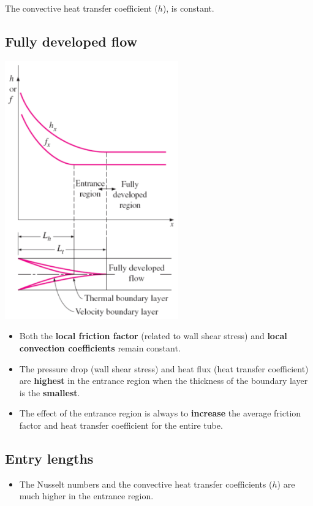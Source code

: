 \documentclass[11pt]{article}
\begin{document}
The convective heat transfer coefficient (\(h\)), is constant.

\subsection{Fully developed flow}
\label{sec:org5c82d1b}
\begin{center}
\includegraphics[height=30em]{./images/fully-developed-flow-diagram.png}
\end{center}
\begin{itemize}
\item Both the \textbf{local friction factor} (related to wall shear stress) and \textbf{local convection coefficients} remain constant.
\item The pressure drop (wall shear stress) and heat flux (heat transfer coefficient) are \textbf{highest} in the entrance region when the thickness of the boundary layer is the \textbf{smallest}.
\item The effect of the entrance region is always to \textbf{increase} the average friction factor and heat transfer coefficient for the entire tube.
\end{itemize}

\subsection{Entry lengths}
\label{sec:org2b73d0f}
\begin{itemize}
\item The Nusselt numbers and the convective heat transfer coefficients (\(h\)) are much higher in the entrance region.
\end{itemize}
\end{document}
